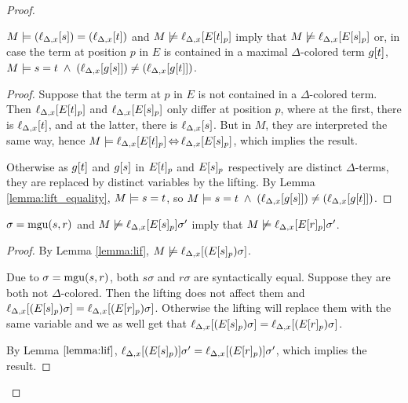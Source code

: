 \documentclass[,%
	paper=a4,%
	DIV14, 
	liststotoc,
	bibtotoc,
	draft=false,%
	numbers=noendperiod
]{scrartcl}
\newcommand{\lif}[1]{\lift{\Delta}{#1}{x}}
\begin{document}
\begin{proof}
\begin{description}
\begin{enumerate}
				\begin{lemma}
					\label{aga5tg5ba}
					$M \entails (\lif{s}) = (\lif{t})$ and $M\notentails \lif{E\occurat{t}{p}}$ imply that $M\notentails \lif{E\occurat{s}{p}}$
					or, in case the term at position $p$ in $E$ is contained in a maximal $\Delta$-colored term $g[t]$, $M\entails s=t \;\land\;(\lif{g\occur{s}}) \neq (\lif{g\occur{t}})$.
				\end{lemma}
				\begin{proof} 
					Suppose that the term at $p$ in $E$ is not contained in a $\Delta$-colored term. Then
					$\lif{E\occurat{t}{p}}$ and $\lif{E\occurat{s}{p}}$ only differ at position $p$, where at the first, there is $\lif{t}$, and at the latter, there is $\lif{s}$. But in $M$, they are interpreted the same way, hence $M\entails \lif{E\occurat{t}{p}} \semiff \lif{E\occurat{s}{p}}$, which implies the result.

					Otherwise as $g[t]$ and $g[s]$ in $E{[t]_{p}}$ and $E{[s]_{p}}$ respectively  are distinct $\Delta$-terms, they are replaced by distinct variables by the lifting.
					By Lemma \ref{lemma:lift_equality}, $M\models s=t$, so $M \entails\nolinebreak s=\nolinebreak t \;\land\;(\lif{g\occur{s}})  \neq (\lif{g\occur{t}})$.


				\end{proof} 
				\bigskip

				\begin{lemma}
					$\sigma=\operatorname{mgu}(s, r)$ and $M\notentails \lif{E\occurat{s}{p}}\sigma'$ imply that $M\notentails \lif{E\occurat{r}{p}}\sigma'$.
				\end{lemma}\nopagebreak 
				\begin{proof} 
					By Lemma \ref{lemma:lif}, $M\notentails \lif{(E\occurat{s}{p})\sigma}$. 


					Due to $\sigma=\operatorname{mgu}(s, r)$, both $s\sigma$ and $r\sigma$ are syntactically equal.
					Suppose they are both not $\Delta$-colored.
Then the lifting does not affect them and 
$\lif{(E\occurat{s}{p})\sigma} = \lif{(E\occurat{r}{p})\sigma}$.
Otherwise the lifting will replace them with the same variable and we as well get that
$\lif{(E\occurat{s}{p})\sigma} = \lif{(E\occurat{r}{p})\sigma}$.

By Lemma $\ref{lemma:lif}$, 
$\lif{(E\occurat{s}{p})}\sigma' = \lif{(E\occurat{r}{p})}\sigma'$, which implies the result.
				\end{proof} 





\end{enumerate}
\end{description}
\end{proof}
\end{document}
